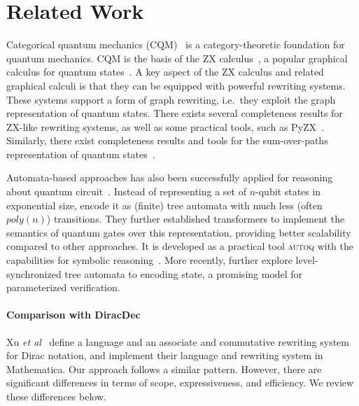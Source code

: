 \section{Related Work}
Categorical quantum mechanics (CQM)~\cite{DBLP:conf/lics/AbramskyC04}
is a category-theoretic foundation for quantum mechanics. CQM is the
basis of the ZX calculus~\cite{DBLP:conf/icalp/CoeckeD08}, a popular
graphical calculus for quantum states~\cite{vandewetering2020zx}. A
key aspect of the ZX calculus and related graphical calculi is that
they can be equipped with powerful rewriting systems. These systems
support a form of graph rewriting, i.e.\, they exploit the graph
representation of quantum states. There exists several completeness
results for ZX-like rewriting systems, as well as some practical
tools, such as PyZX~\cite{kissinger2019pyzx}. Similarly, there exist
completeness results and tools for the sum-over-paths representation
of quantum states~\cite{amy2018towards,amy2023complete}.

Automata-based approaches has also been successfully applied for reasoning about quantum circuit~\cite{AutoQ_pldi_2023}. Instead of representing a set of  $n$-qubit states in exponential size, \cite{AutoQ_pldi_2023} encode it as (finite) tree automata with much less (often $\mathit{poly}(n)$) transitions.  They further established transformers to implement the semantics of quantum gates over this representation, providing better scalability compared to other approaches. It is developed as a practical tool \textsc{autoq} with the capabilities for symbolic reasoning~\cite{AutoQ2023}. More recently, \cite{AutoQ_popl2025} further explore level-synchronized tree automata to encoding state, a promising model for parameterized verification.

\paragraph*{Comparison with DiracDec~\cite{diracdec}}
Xu \emph{et al}~\cite{diracdec} define a language and an associate and
commutative rewriting system for Dirac notation, and implement their
language and rewriting system in Mathematica. Our approach follows a
similar pattern. However, there are significant differences in terms
of scope, expressiveness, and efficiency. We review these differences
below.


